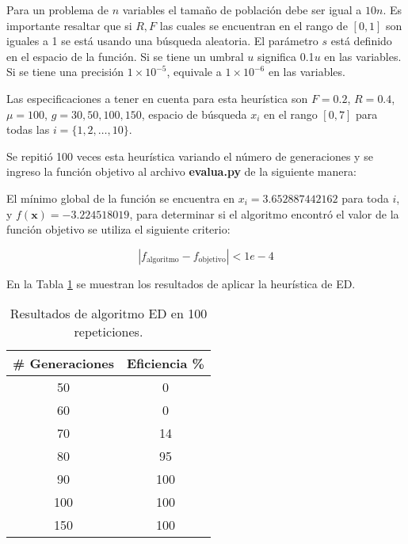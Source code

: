 \documentclass[conference]{IEEEtran}
\begin{document}
Para un problema de $n$ variables el tamaño de población debe ser igual a $10n$. Es importante resaltar que si $R, F$ las cuales se encuentran en el rango de $[0,1]$ son iguales a 1 se está usando una búsqueda aleatoria. El parámetro $s$ está definido en el espacio de la función. Si se tiene un umbral $u$ significa 0.1$u$ en las variables. Si se tiene una precisión $1 \times 10^{-5}$, equivale a $1 \times 10^{-6}$ en las variables.

Las especificaciones a tener en cuenta para esta heurística son $F = 0.2$, $R = 0.4$, $\mu = 100$, $g=30, 50, 100, 150$, espacio de búsqueda $x_{i} $ en el rango $ [0,7]$ para todas las $i = \{1, 2, \ldots,10\}$.

Se repitió 100 veces esta heurística variando el número de generaciones y se ingreso la función objetivo al archivo \textbf{evalua.py} de la siguiente manera:



El mínimo global de la función se encuentra en $x_{i} = 3.652887442162$ para toda $i$, y  $f(\mathbf{x}) = -3.224518019$, para determinar si el algoritmo encontró el valor de la función objetivo se utiliza el siguiente criterio:


\begin{equation}
|f_\text{algoritmo} - f_\text{objetivo} | < 1e-4
\end{equation}


En la Tabla \ref{tab:ED} se muestran los resultados de aplicar la heurística de  ED.

\begin{table}[!hbp]   
	\caption{Resultados de algoritmo ED en 100 repeticiones.}                                                                                                                
		\centering                                       
		\begin{tabular}{cc}
			\hline                                             
			\#{} Generaciones & Eficiencia \% \\                     
			\hline 
			50 & 0\\                                            
			60 & 0\\
			70 & 14\\
			80 & 95\\
			90 & 100\\
			100 & 100\\
			150 & 100\\
			\hline                                             
		\end{tabular}
		\label{tab:ED}
	\end{table}	
\end{document}
